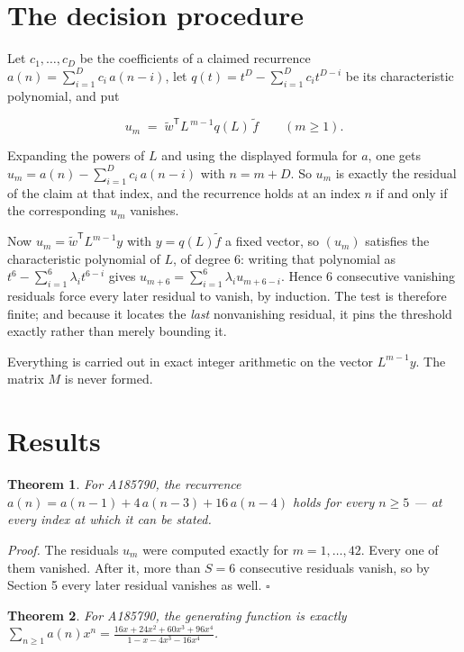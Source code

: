 \documentclass[11pt]{article}
\newtheorem{theorem}{Theorem}
\theoremstyle{definition}
\begin{document}
\section{The decision procedure}

Let $c_1,\dots,c_D$ be the coefficients of a claimed recurrence $a(n) = \sum_{i=1}^{D} c_i\,a(n-i)$, let $q(t) = t^{D} - \sum_{i=1}^{D} c_i t^{D-i}$ be its characteristic polynomial, and put

\[u_m \;=\; \tilde w^{\mathsf T} L^{\,m-1} q(L)\,\tilde f \qquad (m \ge 1).\]

Expanding the powers of $L$ and using the displayed formula for $a$, one gets $u_m = a(n) - \sum_{i=1}^{D} c_i\,a(n-i)$ with $n = m + D$. So $u_m$ is exactly the residual of the claim at that index, and the recurrence holds at an index $n$ if and only if the corresponding $u_m$ vanishes.

Now $u_m = \tilde w^{\mathsf T} L^{m-1} y$ with $y = q(L)\tilde f$ a fixed vector, so $(u_m)$ satisfies the characteristic polynomial of $L$, of degree $6$: writing that polynomial as $t^{6} - \sum_{i=1}^{6} \lambda_i t^{6-i}$ gives $u_{m+6} = \sum_{i=1}^{6} \lambda_i u_{m+6-i}$. Hence $6$ consecutive vanishing residuals force every later residual to vanish, by induction. The test is therefore finite; and because it locates the {\itshape last} nonvanishing residual, it pins the threshold exactly rather than merely bounding it.

Everything is carried out in exact integer arithmetic on the vector $L^{m-1}y$. The matrix $M$ is never formed.

\section{Results}

\begin{theorem} For A185790, the recurrence $a(n) = a(n-1) + 4\,a(n-3) + 16\,a(n-4)$ holds for every $n \ge 5$ --- at every index at which it can be stated.\end{theorem}

{\itshape Proof.} The residuals $u_m$ were computed exactly for $m = 1,\dots,42$. Every one of them vanished. After it, more than $S = 6$ consecutive residuals vanish, so by Section 5 every later residual vanishes as well. $\square$

\begin{theorem} For A185790, the generating function is exactly $\sum_{n\ge 1} a(n)x^n = \frac{16x + 24x^{2} + 60x^{3} + 96x^{4}}{1 - x - 4x^{3} - 16x^{4}}$.\end{theorem}
\end{document}
